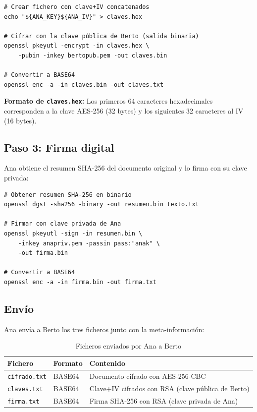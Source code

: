 \begin{lstlisting}[caption=Cifrado de claves simétricas con RSA]
# Crear fichero con clave+IV concatenados
echo "${ANA_KEY}${ANA_IV}" > claves.hex

# Cifrar con la clave pública de Berto (salida binaria)
openssl pkeyutl -encrypt -in claves.hex \
    -pubin -inkey bertopub.pem -out claves.bin

# Convertir a BASE64
openssl enc -a -in claves.bin -out claves.txt
\end{lstlisting}

\textbf{Formato de \texttt{claves.hex}:} Los primeros 64 caracteres hexadecimales corresponden a la clave AES-256 (32 bytes) y los siguientes 32 caracteres al IV (16 bytes).

\subsection{Paso 3: Firma digital}

Ana obtiene el resumen SHA-256 del documento original y lo firma con su clave privada:

\begin{lstlisting}[caption=Firma digital del documento]
# Obtener resumen SHA-256 en binario
openssl dgst -sha256 -binary -out resumen.bin texto.txt

# Firmar con clave privada de Ana
openssl pkeyutl -sign -in resumen.bin \
    -inkey anapriv.pem -passin pass:"anak" \
    -out firma.bin

# Convertir a BASE64
openssl enc -a -in firma.bin -out firma.txt
\end{lstlisting}

\subsection{Envío}

Ana envía a Berto los tres ficheros junto con la meta-información:

\begin{table}[H]
    \centering
    \caption{Ficheros enviados por Ana a Berto}
    \begin{tabularx}{\textwidth}{l|l|p{6cm}}
        \toprule
        \textbf{Fichero} & \textbf{Formato} & \textbf{Contenido} \\
        \midrule
        \texttt{cifrado.txt} & BASE64 & Documento cifrado con AES-256-CBC \\
        \texttt{claves.txt} & BASE64 & Clave+IV cifrados con RSA (clave pública de Berto) \\
        \texttt{firma.txt} & BASE64 & Firma SHA-256 con RSA (clave privada de Ana) \\
        \bottomrule
    \end{tabularx}
\end{table}

